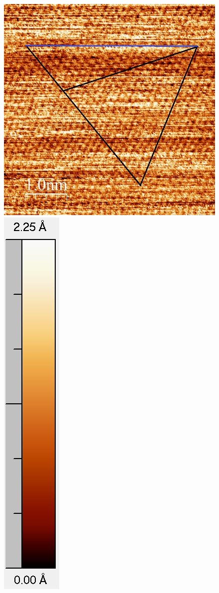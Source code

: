 \documentclass[12pt,a4paper]{article}
\begin{document}
\begin{figure}[H]
\centering
\includegraphics[scale=0.36]{Bilder/Atome/strom5_h.jpg}
\includegraphics[scale=0.48]{Bilder/Atome/strom5_scale.png}

\end{figure}
\end{document}
